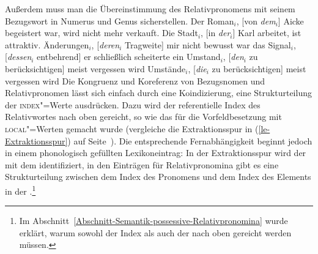 Außerdem muss man die Übereinstimmung des Relativpronomens mit seinem Bezugswort in Numerus und Genus sicherstellen.
\eal
\ex Der Roman$_i$, [von \emph{dem}$_i$] Aicke begeistert war, wird nicht mehr verkauft.
\ex Die Stadt$_i$, [in \emph{der}$_i$] Karl arbeitet, ist attraktiv.
\ex Änderungen$_i$, [\emph{deren}$_i$ Tragweite] mir nicht bewusst war
\ex das Signal$_i$, [\emph{dessen}$_i$ entbehrend] er schließlich scheiterte
\ex ein Umstand$_i$, [\emph{den}$_i$ zu berücksichtigen] meist vergessen wird
\ex Umstände$_i$, [\emph{die}$_i$ zu berücksichtigen] meist vergessen wird
\zl
Die Kongruenz und Koreferenz von Bezugsnomen und Relativpronomen lässt sich einfach durch eine Koindizierung, 
eine Strukturteilung der \textsc{index}"=Werte ausdrücken. Dazu wird der referentielle Index
des Relativwortes nach oben gereicht, so wie das für die Vorfeldbesetzung mit
\textsc{local}"=Werten gemacht wurde (vergleiche die Extraktionsspur in (\ref{le-Extraktionsspur}) auf Seite~\pageref{le-Extraktionsspur}).
Die entsprechende Fernabhängigkeit beginnt jedoch in einem phonologisch gefüllten Lexikoneintrag:
\ea{}
\z
In der Extraktionsspur wird der \localw mit dem \slashel identifiziert,
in den Einträgen für Relativpronomina gibt es eine Strukturteilung zwischen dem Index des Pronomens
und dem Index des Elements in der \rell.\footnote{%
  Im Abschnitt~\ref{Abschnitt-Semantik-possessive-Relativpronomina} wurde erklärt, warum sowohl der
  Index als auch der \ltopw nach oben gereicht werden müssen.
}

